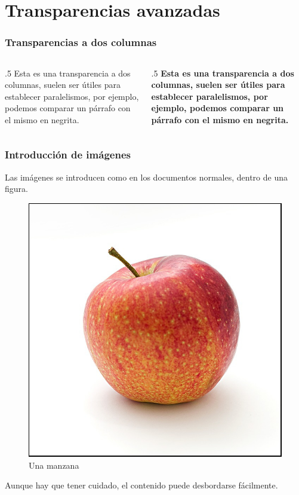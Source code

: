 \documentclass{beamer}
\begin{document}
    \section{Transparencias avanzadas}
    \begin{frame}
        \frametitle{Transparencias a dos columnas}
        \begin{columns}
            \begin{column}{.5\hsize}
                Esta es una transparencia a dos columnas, suelen ser útiles para
                establecer paralelismos, por ejemplo, podemos comparar un
                párrafo con el mismo en negrita. 
            \end{column}
            \begin{column}{.5\hsize}
                \textbf{Esta es una transparencia a dos columnas,
                suelen ser útiles para
                establecer paralelismos, por ejemplo, podemos comparar un
                párrafo con el mismo en negrita.}
            \end{column}
        \end{columns}
    \end{frame}
    \begin{frame}
        \frametitle{Introducción de imágenes}
        Las imágenes se introducen como en los documentos normales, dentro de
        una figura.
        \begin{figure}[H]
            \includegraphics[width=.3333\hsize]{manzana}
            \caption{Una manzana}
            \label{fig:manzana}
        \end{figure}
        Aunque hay que tener cuidado, el contenido puede desbordarse fácilmente.
    \end{frame}
\end{document}
